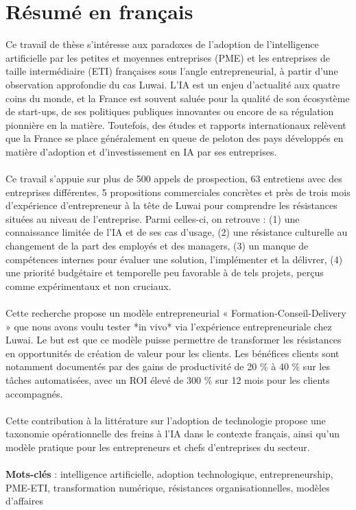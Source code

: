 \section*{Résumé en français}

Ce travail de thèse s’intéresse aux paradoxes de l’adoption de l’intelligence artificielle par les petites et moyennes entreprises (PME) et les entreprises de taille intermédiaire (ETI) françaises sous l’angle entrepreneurial, à partir d’une observation approfondie du cas Luwai. L’IA est un enjeu d’actualité aux quatre coins du monde, et la France est souvent saluée pour la qualité de son écosystème de start-ups, de ses politiques publiques innovantes ou encore de sa régulation pionnière en la matière. Toutefois, des études et rapports internationaux relèvent que la France se place généralement en queue de peloton des pays développés en matière d’adoption et d’investissement en IA par ses entreprises.
\\\\
Ce travail s’appuie sur plus de 500 appels de prospection, 63 entretiens avec des entreprises différentes, 5 propositions commerciales concrètes et près de trois mois d’expérience d’entrepreneur à la tête de Luwai pour comprendre les résistances situées au niveau de l’entreprise. Parmi celles-ci, on retrouve :
(1) une connaissance limitée de l’IA et de ses cas d’usage,
(2) une résistance culturelle au changement de la part des employés et des managers,
(3) un manque de compétences internes pour évaluer une solution, l’implémenter et la délivrer,
(4) une priorité budgétaire et temporelle peu favorable à de tels projets, perçus comme expérimentaux et non cruciaux.
\\\\
Cette recherche propose un modèle entrepreneurial « Formation-Conseil-Delivery » que nous avons voulu tester *in vivo* via l’expérience entrepreneuriale chez Luwai. Le but est que ce modèle puisse permettre de transformer les résistances en opportunités de création de valeur pour les clients. Les bénéfices clients sont notamment documentés par des gains de productivité de 20 \% à 40 \% sur les tâches automatisées, avec un ROI élevé de 300 \% sur 12 mois pour les clients accompagnés.
\\\\
Cette contribution à la littérature sur l’adoption de technologie propose une taxonomie opérationnelle des freins à l’IA dans le contexte français, ainsi qu’un modèle pratique pour les entrepreneurs et chefs d’entreprises du secteur.
\\\\
\textbf{Mots-clés} : intelligence artificielle, adoption technologique, entrepreneurship, PME-ETI, transformation numérique, résistances organisationnelles, modèles d’affaires


